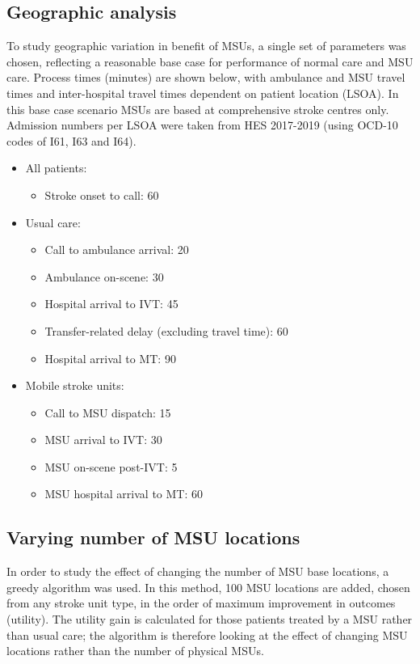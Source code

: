 \subsection{Geographic analysis}

To study geographic variation in benefit of MSUs, a single set of parameters was chosen, reflecting a reasonable base case for performance of normal care and MSU care. Process times (minutes) are shown below, with ambulance and MSU travel times and inter-hospital travel times dependent on patient location (LSOA). In this base case scenario MSUs are based at comprehensive stroke centres only. Admission numbers per LSOA were taken from HES 2017-2019 (using OCD-10 codes of I61, I63 and I64).


\begin{minipage}{1.0\textwidth}  %
\begin{spacing}{1.2}
\begin{itemize}
    \item All patients:
    \begin{itemize}
        \item Stroke onset to call: 60
    \end{itemize}
    \item Usual care:
    \begin{itemize}
        \item Call to ambulance arrival: 20
        \item Ambulance on-scene: 30
        \item Hospital arrival to IVT: 45
        \item Transfer-related delay (excluding travel time): 60
        \item Hospital arrival to MT: 90
    \end{itemize}
    \item Mobile stroke units:
    \begin{itemize}
        \item Call to MSU dispatch: 15
        \item MSU arrival to IVT: 30
        \item MSU on-scene post-IVT: 5
        \item MSU hospital arrival to MT: 60
    \end{itemize}
\end{itemize}
\end{spacing}
\end{minipage}


\subsection{Varying number of MSU locations}

In order to study the effect of changing the number of MSU base locations, a greedy algorithm was used. In this method, 100 MSU locations are added, chosen from any stroke unit type, in the order of maximum improvement in outcomes (utility). The utility gain is calculated for those patients treated by a MSU rather than usual care; the algorithm is therefore looking at the effect of changing MSU locations rather than the number of physical MSUs.